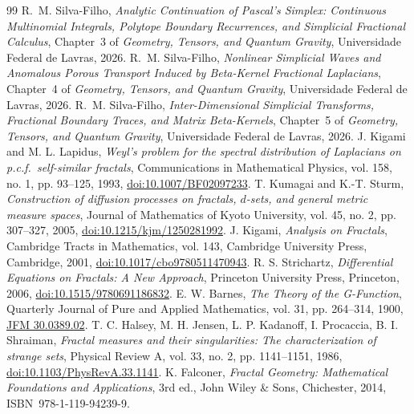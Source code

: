 \documentclass[11pt,a4paper]{article}
\theoremstyle{plain}
\theoremstyle{definition}
\theoremstyle{remark}
\numberwithin{equation}{section}
\begin{document}


\begin{thebibliography}{99}
 R.~M. Silva-Filho, \emph{Analytic Continuation of Pascal's Simplex: Continuous Multinomial Integrals, Polytope Boundary Recurrences, and Simplicial Fractional Calculus}, Chapter~3 of \emph{Geometry, Tensors, and Quantum Gravity}, Universidade Federal de Lavras, 2026.
 R.~M. Silva-Filho, \emph{Nonlinear Simplicial Waves and Anomalous Porous Transport Induced by Beta-Kernel Fractional Laplacians}, Chapter~4 of \emph{Geometry, Tensors, and Quantum Gravity}, Universidade Federal de Lavras, 2026.
 R.~M. Silva-Filho, \emph{Inter-Dimensional Simplicial Transforms, Fractional Boundary Traces, and Matrix Beta-Kernels}, Chapter~5 of \emph{Geometry, Tensors, and Quantum Gravity}, Universidade Federal de Lavras, 2026.
 J. Kigami and M. L. Lapidus, \emph{Weyl's problem for the spectral distribution of Laplacians on p.c.f.\ self-similar fractals}, Communications in Mathematical Physics, vol. 158, no. 1, pp. 93--125, 1993, \href{https://doi.org/10.1007/BF02097233}{doi:10.1007/BF02097233}.
 T. Kumagai and K.-T. Sturm, \emph{Construction of diffusion processes on fractals, $d$-sets, and general metric measure spaces}, Journal of Mathematics of Kyoto University, vol. 45, no. 2, pp. 307--327, 2005, \href{https://doi.org/10.1215/kjm/1250281992}{doi:10.1215/kjm/1250281992}.
 J. Kigami, \emph{Analysis on Fractals}, Cambridge Tracts in Mathematics, vol. 143, Cambridge University Press, Cambridge, 2001, \href{https://doi.org/10.1017/cbo9780511470943}{doi:10.1017/cbo9780511470943}.
 R. S. Strichartz, \emph{Differential Equations on Fractals: A New Approach}, Princeton University Press, Princeton, 2006, \href{https://doi.org/10.1515/9780691186832}{doi:10.1515/9780691186832}.
 E. W. Barnes, \emph{The Theory of the G-Function}, Quarterly Journal of Pure and Applied Mathematics, vol. 31, pp. 264--314, 1900, \href{https://zbmath.org/?q=an:30.0389.02}{JFM 30.0389.02}.
 T. C. Halsey, M. H. Jensen, L. P. Kadanoff, I. Procaccia, B. I. Shraiman, \emph{Fractal measures and their singularities: The characterization of strange sets}, Physical Review A, vol. 33, no. 2, pp. 1141--1151, 1986, \href{https://doi.org/10.1103/PhysRevA.33.1141}{doi:10.1103/PhysRevA.33.1141}.
 K. Falconer, \emph{Fractal Geometry: Mathematical Foundations and Applications}, 3rd ed., John Wiley \& Sons, Chichester, 2014, ISBN~978-1-119-94239-9.

\end{thebibliography}
\end{document}
